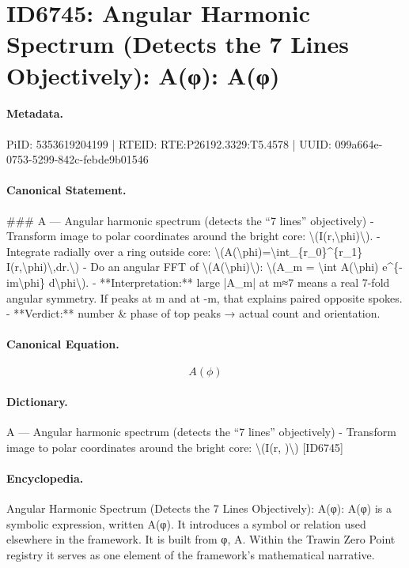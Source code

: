 \section*{ID6745: Angular Harmonic Spectrum (Detects the 7 Lines Objectively): A(φ): A(φ)}
\paragraph{Metadata.}
PiID: 5353619204199 | RTEID: RTE:P26192.3329:T5.4578 | UUID: 099a664e-0753-5299-842c-febde9b01546

\paragraph{Canonical Statement.}
\#\#\# A — Angular harmonic spectrum (detects the “7 lines” objectively) - Transform image to polar coordinates around the bright core: \textbackslash{}(I(r,\textbackslash{}phi)\textbackslash{}). - Integrate radially over a ring outside core: \textbackslash{}(A(\textbackslash{}phi)=\textbackslash{}int\_\{r\_0\}\textasciicircum{}\{r\_1\} I(r,\textbackslash{}phi)\textbackslash{},dr.\textbackslash{}) - Do an angular FFT of \textbackslash{}(A(\textbackslash{}phi)\textbackslash{}): \textbackslash{}(A\_m = \textbackslash{}int A(\textbackslash{}phi) e\textasciicircum{}\{-im\textbackslash{}phi\} d\textbackslash{}phi\textbackslash{}). - **Interpretation:** large |A\_m| at m≈7 means a real 7-fold angular symmetry. If peaks at m and at -m, that explains paired opposite spokes. - **Verdict:** number \& phase of top peaks → actual count and orientation.

\paragraph{Canonical Equation.}
\[
A(\phi)
\]

\paragraph{Dictionary.}
A — Angular harmonic spectrum (detects the “7 lines” objectively) - Transform image to polar coordinates around the bright core: \textbackslash{}(I(r, )\textbackslash{}) [ID6745]

\paragraph{Encyclopedia.}
Angular Harmonic Spectrum (Detects the 7 Lines Objectively): A(φ): A(φ) is a symbolic expression, written A(φ). It introduces a symbol or relation used elsewhere in the framework. It is built from φ, A. Within the Trawin Zero Point registry it serves as one element of the framework's mathematical narrative.
